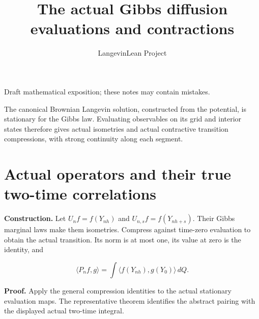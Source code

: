 \documentclass[11pt,a4paper]{article}
\title{\texorpdfstring{The actual Gibbs diffusion evaluations and contractions}{The actual Gibbs diffusion evaluations and contractions}}
\author{LangevinLean Project}
\date{}
\begin{document}
\maketitle
Draft mathematical exposition; these notes may contain mistakes.


The canonical Brownian Langevin solution, constructed from the potential, is stationary for the Gibbs law. Evaluating observables on its grid and interior states therefore gives actual isometries and actual contractive transition compressions, with strong continuity along each segment.


\section{\texorpdfstring{Actual operators and their true two-time correlations}{Actual operators and their true two-time correlations}}


\textbf{Construction.} Let \(U_nf=f(Y_{nh})\) and \(U_{n,s}f=f(Y_{nh+s})\). Their Gibbs marginal laws make them isometries. Compress against time-zero evaluation to obtain the actual transition. Its norm is at most one, its value at zero is the identity, and

\[\langle P_nf,g\rangle=\int\langle f(Y_{nh}),g(Y_0)\rangle\,dQ.\]

\textbf{Proof.} Apply the general compression identities to the actual stationary evaluation maps. The representative theorem identifies the abstract pairing with the displayed actual two-time integral.
\end{document}
